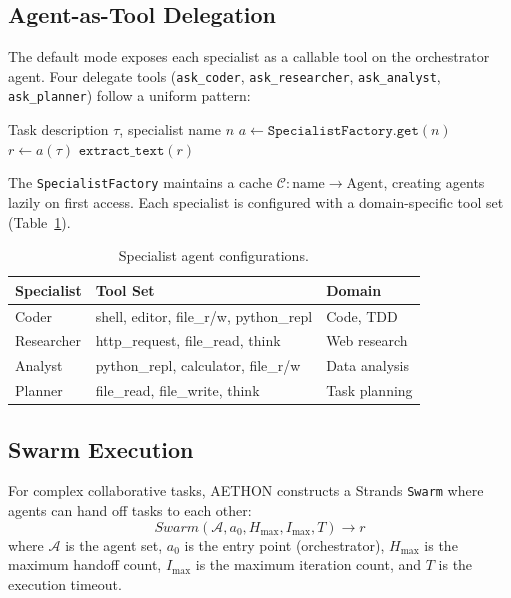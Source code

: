 \documentclass[9pt,twocolumn,letterpaper]{extarticle}
\begin{document}
\subsection{Agent-as-Tool Delegation}

The default mode exposes each specialist as a callable tool on the orchestrator agent.
Four delegate tools (\texttt{ask\_coder}, \texttt{ask\_researcher}, \texttt{ask\_analyst}, \texttt{ask\_planner}) follow a uniform pattern:

\begin{algorithm}[H]
\caption{Agent-as-Tool Delegation}
\label{alg:delegate}
\begin{algorithmic}[1]
\REQUIRE Task description $\tau$, specialist name $n$
\STATE $a \leftarrow \texttt{SpecialistFactory.get}(n)$
\STATE $r \leftarrow a(\tau)$ 
\RETURN $\texttt{extract\_text}(r)$
\end{algorithmic}
\end{algorithm}

The \texttt{SpecialistFactory} maintains a cache $\mathcal{C}: \text{name} \to \text{Agent}$, creating agents lazily on first access.
Each specialist is configured with a domain-specific tool set (Table~\ref{tab:specialists}).

\begin{table}[t]
\caption{Specialist agent configurations.}
\label{tab:specialists}
\centering
\small
\begin{tabular}{@{}lll@{}}
\toprule
\textbf{Specialist} & \textbf{Tool Set} & \textbf{Domain} \\
\midrule
Coder      & shell, editor, file\_r/w, python\_repl & Code, TDD \\
Researcher & http\_request, file\_read, think        & Web research \\
Analyst    & python\_repl, calculator, file\_r/w      & Data analysis \\
Planner    & file\_read, file\_write, think           & Task planning \\
\bottomrule
\end{tabular}
\end{table}

\subsection{Swarm Execution}

For complex collaborative tasks, AETHON constructs a Strands \texttt{Swarm} where agents can hand off tasks to each other:
%
\begin{equation}
\textit{Swarm}(\mathcal{A}, a_0, H_{\max}, I_{\max}, T) \to r
\label{eq:swarm}
\end{equation}
%
\noindent where $\mathcal{A}$ is the agent set, $a_0$ is the entry point (orchestrator), $H_{\max}$ is the maximum handoff count, $I_{\max}$ is the maximum iteration count, and $T$ is the execution timeout.
\end{document}
